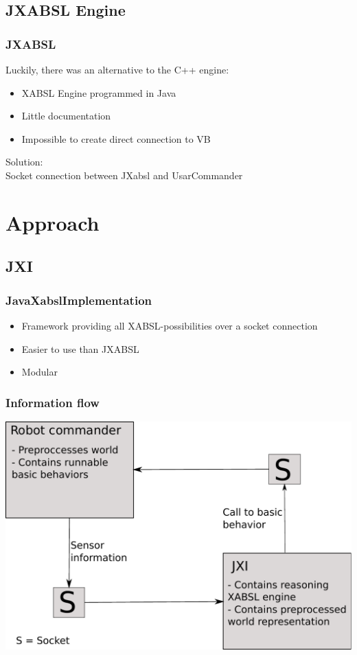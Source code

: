 \documentclass{beamer}
\newcommand{\slide}[2]
{
\begin{frame}
\frametitle{#1} 

#2

\end{frame}
}
\begin{document}
\subsection{JXABSL Engine}
\slide{JXABSL}
{
    Luckily, there was an alternative to the C++ engine:
    \begin{itemize}
        \item XABSL Engine programmed in Java
        \item Little documentation
        \item Impossible to create direct connection to VB
    \end{itemize}
    Solution:\\
    Socket connection between JXabsl and UsarCommander
}
\section{Approach}
\subsection{JXI}
\slide{JavaXabslImplementation}
{
    \begin{itemize}
        \item Framework providing all XABSL-possibilities over a socket
        connection 
        \item Easier to use than JXABSL
        \item Modular
    \end{itemize}
}
\slide{Information flow}
{
    \includegraphics[height=.8\textheight]{informationFlow.pdf}
}
\end{document}
